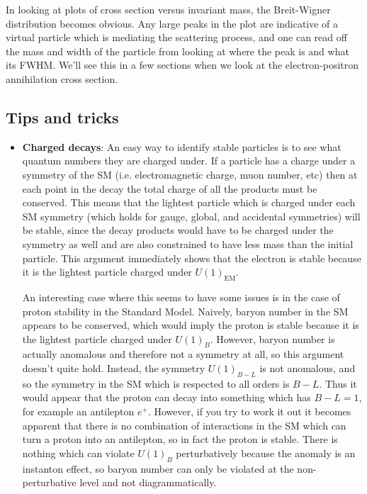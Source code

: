 \documentclass[11pt, oneside]{article}   	%
\theoremstyle{definition}
\numberwithin{equation}{subsection}		%
\begin{document}
In looking at plots of cross section versus invariant mass, the Breit-Wigner distribution becomes obvious. Any large peaks in the plot are indicative of a 
virtual particle which is mediating the scattering process, and one can read off the mass and width of the particle from looking at where the peak is 
and what its FWHM. We'll see this in a few sections when we look at the electron-positron annihilation cross section.  

\subsection{Tips and tricks}

\begin{itemize}
\item \textbf{Charged decays}: An easy way to identify stable particles is to see what quantum numbers they are charged under. If a particle has a charge under a 
symmetry of the SM (i.e. electromagnetic charge, muon number, etc) then at each point in the decay the total charge of all the products 
must be conserved. This means that the lightest particle which is charged under each SM symmetry (which holds for gauge, global, and 
accidental symmetries) will be stable, since the decay products would have to be charged under the symmetry as well and are also 
constrained to have less mass than the initial particle. This argument immediately shows that the electron is stable because it is the lightest 
particle charged under $U(1)_\mathrm{EM}$. 

An interesting case where this seems to have some issues is in the case of proton stability in the Standard Model. Naively, baryon number 
in the SM appears to be conserved, which would imply the proton is stable because it is the lightest particle charged under $U(1)_B$. 
However, baryon number is actually anomalous and therefore not a symmetry at all, so this argument doesn't quite hold. Instead, 
the symmetry $U(1)_{B - L}$ is not anomalous, and so the symmetry in the SM which is respected to all orders is $B - L$. Thus it would 
appear that the proton can decay into something which has $B - L = 1$, for example an antilepton $e^+$. However, if you try to work it 
out it becomes apparent that there is no combination of interactions in the SM which can turn a proton into an antilepton, so in fact the 
proton is stable. There is nothing which can violate $U(1)_B$ perturbatively because the anomaly is an instanton effect, so baryon number 
can only be violated at the non-perturbative level and not diagrammatically.


\end{itemize}
\end{document}
